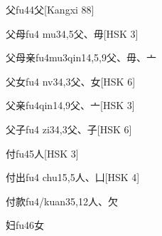 \begin{EntryWithPhonetic}{父}{fu4}{4}{⽗}[Kangxi 88]
\end{EntryWithPhonetic}

\begin{EntryWithPhonetic}{父母}{fu4 mu3}{4,5}{⽗、⽏}[HSK 3]
\end{EntryWithPhonetic}

\begin{EntryWithPhonetic}{父母亲}{fu4mu3qin1}{4,5,9}{⽗、⽏、⼇}
\end{EntryWithPhonetic}

\begin{EntryWithPhonetic}{父女}{fu4 nv3}{4,3}{⽗、⼥}[HSK 6]
\end{EntryWithPhonetic}

\begin{EntryWithPhonetic}{父亲}{fu4qin1}{4,9}{⽗、⼇}[HSK 3]
\end{EntryWithPhonetic}

\begin{EntryWithPhonetic}{父子}{fu4 zi3}{4,3}{⽗、⼦}[HSK 6]
\end{EntryWithPhonetic}

\begin{EntryWithPhonetic}{付}{fu4}{5}{⼈}[HSK 3]
\end{EntryWithPhonetic}

\begin{EntryWithPhonetic}{付出}{fu4 chu1}{5,5}{⼈、⼐}[HSK 4]
\end{EntryWithPhonetic}

\begin{EntryWithPhonetic}{付款}{fu4/kuan3}{5,12}{⼈、⽋}
\end{EntryWithPhonetic}

\begin{EntryWithPhonetic}{妇}{fu4}{6}{⼥}
\end{EntryWithPhonetic}

